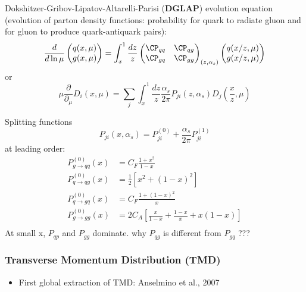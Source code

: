Dokshitzer-Gribov-Lipatov-Altarelli-Parisi (\textbf{DGLAP}) evolution equation 
(evolution of parton density functions: probability for quark to radiate gluon
and for gluon to produce quark-antiquark pairs):
\begin{equation*}
    \frac{d}{d\ln\mu}
    \begin{pmatrix}
	q(x, \mu)   \\
	g(x, \mu)   \\
    \end{pmatrix}
    =
    \int_x^1 \frac{dz}{z}
    \begin{pmatrix}
	\CP_{qq}    & \CP_{qg}	\\
	\CP_{gq}    & \CP_{gg}	\\
    \end{pmatrix}_{(z, \alpha_s)}
    \begin{pmatrix}
	q(x/z, \mu) \\
	g(x/z, \mu) \\
    \end{pmatrix}
\end{equation*}
or
\begin{equation*}
    \mu\frac{\partial}{\partial_\mu}D_i(x, \mu) = 
    \sum_j \int_x^1 \frac{dz}{z}\frac{\alpha_s}{2\pi}P_{ji}(z, \alpha_s) D_j(\frac{x}{z}, \mu)
\end{equation*}

Splitting functions 
\begin{equation*}
    P_{ji}(x, \alpha_s) = P_{ji}^{(0)} + \frac{\alpha_s}{2\pi}P_{ji}^{(1)}
\end{equation*}
at leading order:
\begin{equation*}
    \begin{aligned}
	P^{(0)}_{g \rightarrow qq}(x) &= C_F \frac{1+x^2}{1-x}	\\
	P^{(0)}_{q \rightarrow qg}(x) &= \frac{1}{2} [x^2 + (1-x)^2 ]	\\
	P^{(0)}_{q \rightarrow gq}(x) &= C_F \frac{1+(1-x)^2}{x}	\\
	P^{(0)}_{g \rightarrow gg}(x) &= 2C_A \left[ \frac{x}{1-x} + \frac{1-x}{x} + x(1-x)\right]\\
    \end{aligned}
\end{equation*}
At small x, $P_{qp}$ and $P_{gg}$ dominate.
why $P_{qg}$ is different from $P_{gq}$ ???

\subsubsection{Transverse Momentum Distribution (TMD)}
\begin{itemize}
    \item First global extraction of TMD: Anselmino et al., 2007
\end{itemize}
